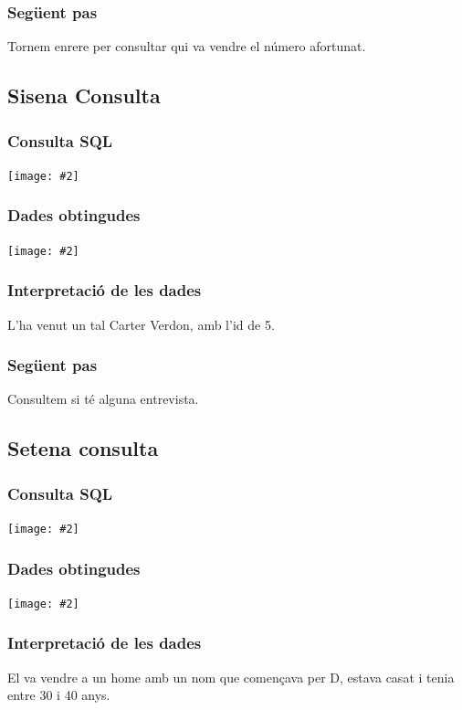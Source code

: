 \documentclass[a4paper,12pt]{article}
\newcommand{\mygraphic}[2][width=\textwidth]{\begin{center}
		\centering\texttt{[image: \#2]}\par
\end{center}}
\begin{document}
\subsubsection{Següent pas}
Tornem enrere per consultar qui va vendre el número afortunat.

\newpage
\subsection{Sisena Consulta}

\subsubsection{Consulta SQL}
\mygraphic{imatges/11.png}

\subsubsection{Dades obtingudes}
\mygraphic{imatges/12.png}

\subsubsection{Interpretació de les dades}
L'ha venut un tal Carter Verdon, amb l'id de 5.

\subsubsection{Següent pas}
Consultem si té alguna entrevista.

\newpage
\subsection{Setena consulta}

\subsubsection{Consulta SQL}
\mygraphic{imatges/13.png}

\subsubsection{Dades obtingudes}
\mygraphic{imatges/14.png}

\subsubsection{Interpretació de les dades}
El va vendre a un home amb un nom que començava per D, estava casat i tenia entre 30 i 40 anys.
\end{document}
